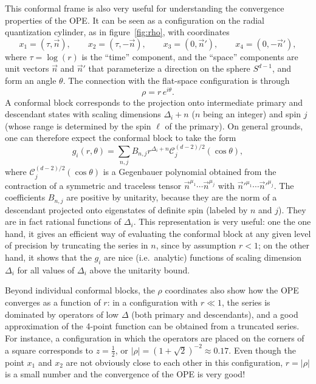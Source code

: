 \documentclass[a4paper,12pt]{article}
\numberwithin{equation}{section}
\begin{document}
This conformal frame is also very useful for understanding the convergence properties of the OPE. It can be seen as a configuration on the radial quantization cylinder, as in figure~\ref{fig:rho}, with coordinates
\begin{equation}
	x_1 = (\tau, \vec{n}),
	\qquad
	x_2 = (\tau, -\vec{n}),
	\qquad
	x_3 = (0, \vec{n}'),
	\qquad
	x_4 = (0, -\vec{n}'),
\end{equation}
where $\tau = \log(r)$ is the ``time'' component, and the ``space'' components are unit vectors $\vec{n}$ and $\vec{n}'$ that parameterize a direction on the sphere $S^{d-1}$, and form an angle $\theta$. The connection with the flat-space configuration is through
\begin{equation}
	\rho = r \, e^{i \theta}.
\end{equation}
A conformal block corresponds to the projection onto intermediate primary and descendant states with scaling dimensions $\Delta_i + n$ ($n$ being an integer) and spin $j$ (whose range is determined by the spin $\ell$ of the primary). On general grounds, one can therefore expect the conformal block to take the form
\begin{equation}
	g_i(r, \theta)
	= \sum_{n,j} B_{n,j} r^{\Delta_i + n}
	\mathcal{C}_j^{(d-2)/2}(\cos\theta),
	\label{eq:radialexpansion}
\end{equation}
where $\mathcal{C}_j^{(d-2)/2}(\cos\theta)$ is a Gegenbauer polynomial obtained from the contraction of a symmetric and traceless tensor $\vec{n}^{\mu_1} \cdots \vec{n}^{\mu_j}$ with $\vec{n}'^{\mu_1} \cdots \vec{n}'^{\mu_j}$.
The coefficients $B_{n,j}$ are positive by unitarity, because they are the norm of a descendant projected onto eigenstates of definite spin (labeled by $n$ and $j$). They are in fact rational functions of $\Delta_i$.
This representation is very useful: one the one hand, it gives an efficient way of evaluating the conformal block at any given level of precision by truncating the series in $n$, since by assumption $r < 1$; on the other hand, it shows that the $g_i$ are nice (i.e.~analytic) functions of scaling dimension $\Delta_i$ for all values of $\Delta_i$ above the unitarity bound.

Beyond individual conformal blocks, the $\rho$ coordinates also show how the OPE converges as a function of $r$: in a configuration with $r \ll 1$, the series is dominated by operators of low $\Delta$ (both primary and descendants), and a good approximation of the 4-point function can be obtained from a truncated series.
For instance, a configuration in which the operators are placed on the corners of a square corresponds to $z = \frac{1}{2}$, or $\left| \rho \right| = (1 + \sqrt{2})^{-2} \approx 0.17$. Even though the point $x_1$ and $x_2$ are not obviously close to each other in this configuration, $r = \left| \rho \right|$ is a small number and the convergence of the OPE is very good!
\end{document}
